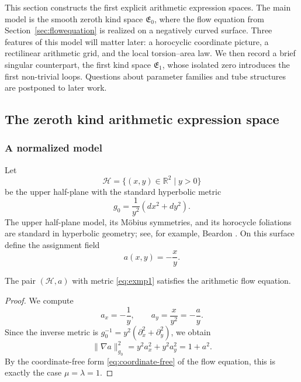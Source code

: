 This section constructs the first explicit arithmetic expression spaces. The main model is the smooth zeroth kind space $\mathfrak{E}_0$, where the flow equation from Section~\ref{sec:flowequation} is realized on a negatively curved surface. Three features of this model will matter later: a horocyclic coordinate picture, a rectilinear arithmetic grid, and the local torsion--area law. We then record a brief singular counterpart, the first kind space $\mathfrak{E}_1$, whose isolated zero introduces the first non-trivial loops. Questions about parameter families and tube structures are postponed to later work.

\subsection{The zeroth kind arithmetic expression space}\label{subsec:motivexamples}\label{subsec:generalframework}

\subsubsection{A normalized model}

Let
\[
\mathcal H = \{(x,y)\in\mathbb R^2\mid y>0\}
\]
be the upper half-plane with the standard hyperbolic metric
\begin{equation}\label{eq:exmp1}
    g_0 = \frac{1}{y^2}(dx^2+dy^2).
\end{equation}
The upper half-plane model, its Möbius symmetries, and its horocycle foliations are standard in hyperbolic geometry; see, for example, Beardon \cite{Beardon1983DiscreteGroups}. On this surface define the assignment field
\[
    a(x,y) = -\frac{x}{y}.
\]

\begin{proposition}\label{thm:exmp1}
The pair $(\mathcal H,a)$ with metric \eqref{eq:exmp1} satisfies the arithmetic flow equation.
\end{proposition}

\begin{proof}
We compute
\[
    a_x = -\frac{1}{y},
    \qquad
    a_y = \frac{x}{y^2} = -\frac{a}{y}.
\]
Since the inverse metric is $g_0^{-1}=y^2(\partial_x^2+\partial_y^2)$, we obtain
\[
    \|\nabla a\|_{g_0}^2
    = y^2 a_x^2 + y^2 a_y^2
    = 1 + a^2.
\]
By the coordinate-free form \eqref{eq:coordinate-free} of the flow equation, this is exactly the case $\mu=\lambda=1$.
\end{proof}


